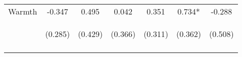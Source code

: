\begin{tabular}{lcccccc}
\noalign{\smallskip}Warmth & -0.347 & 0.495 & 0.042 & 0.351 & 0.734* & -0.288\\
 & \begin{footnotesize}(0.285)\end{footnotesize} & \begin{footnotesize}(0.429)\end{footnotesize} & \begin{footnotesize}(0.366)\end{footnotesize} & \begin{footnotesize}(0.311)\end{footnotesize} & \begin{footnotesize}(0.362)\end{footnotesize} & \begin{footnotesize}(0.508)\end{footnotesize}\\
\noalign{\smallskip}\hline\end{tabular}\\
